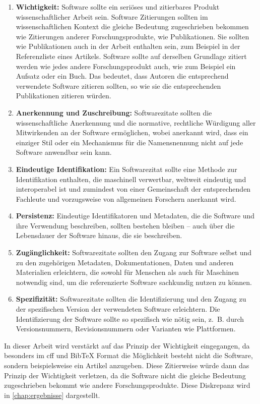 \begin{enumerate}
    \item \textbf{Wichtigkeit:} Software sollte ein seriöses und zitierbares Produkt wissenschaftlicher Arbeit sein. Software Zitierungen sollten im wissenschaftlichen Kontext die gleiche Bedeutung zugeschrieben bekommen wie Zitierungen anderer Forschungsprodukte, wie Publikationen. Sie sollten wie Publikationen auch in der Arbeit enthalten sein, zum Beispiel in der Referenzliste eines Artikels. Software sollte auf derselben Grundlage zitiert werden wie jedes andere Forschungsprodukt auch, wie zum Beispiel ein Aufsatz oder ein Buch. Das bedeutet, dass Autoren die entsprechend verwendete Software zitieren sollten, so wie sie die entsprechenden Publikationen zitieren würden.
    \item \textbf{Anerkennung und Zuschreibung:} Softwarezitate sollten die wissenschaftliche Anerkennung und die normative, rechtliche Würdigung aller Mitwirkenden an der Software ermöglichen, wobei anerkannt wird, dass ein einziger Stil oder ein Mechanismus für die Namensnennung nicht auf jede Software anwendbar sein kann.
    \item \textbf{Eindeutige Identifikation:} Ein Softwarezitat sollte eine Methode zur Identifikation enthalten, die maschinell verwertbar, weltweit eindeutig und interoperabel ist und zumindest von einer Gemeinschaft der entsprechenden Fachleute und vorzugsweise von allgemeinen Forschern anerkannt wird.
    \item \textbf{Persistenz:} Eindeutige Identifikatoren und Metadaten, die die Software und ihre Verwendung beschreiben, sollten bestehen bleiben – auch über die Lebensdauer der Software hinaus, die sie beschreiben.
    \item \textbf{Zugänglichkeit:} Softwarezitate sollten den Zugang zur Software selbst und zu den zugehörigen Metadaten, Dokumentationen, Daten und anderen Materialien erleichtern, die sowohl für Menschen als auch für Maschinen notwendig sind, um die referenzierte Software sachkundig nutzen zu können.
    \item \textbf{Spezifizität:} Softwarezitate sollten die Identifizierung und den Zugang zu der spezifischen Version der verwendeten Software erleichtern. Die Identifizierung der Software sollte so spezifisch wie nötig sein, z. B. durch Versionsnummern, Revisionsnummern oder Varianten wie Plattformen.
\end{enumerate}

In dieser Arbeit wird verstärkt auf das Prinzip der Wichtigkeit eingegangen, da besonders im \gls{cff} und Bib\TeX{} Format die Möglichkeit besteht nicht die Software, sondern beispielsweise ein Artikel anzugeben.
Diese Zitierweise würde dann das Prinzip der Wichtigkeit verletzen, da die Software nicht die gleiche Bedeutung zugeschrieben bekommt wie andere Forschungsprodukte.
Diese Diskrepanz wird in \autoref{chap:ergebnisse} dargestellt.

